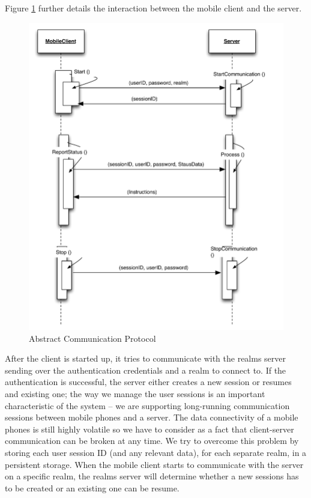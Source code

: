 \noindent Figure \ref{fig.design.comm_protocol} further details the interaction between the mobile client and the server.
\\
\begin{figure}[H]
	\centering
	\includegraphics[width=1.0\linewidth]{fig/abstract_communication_protocol}
	\caption{Abstract Communication Protocol}
	\label{fig.design.comm_protocol}
\end{figure}
\noindent After the client is started up, it tries to communicate with the realms server sending over the authentication credentials and a realm to connect to. If the authentication is successful, the server either creates a new session or resumes and existing one; the way we manage the user sessions is an important characteristic of the system -- we are supporting long-running communication sessions between mobile phones and a server. The data connectivity of a mobile phones is still highly volatile so we have to consider as a fact that client-server communication can be broken at any time. We try to overcome this problem by storing each user session ID (and any relevant data), for each separate realm, in a persistent storage. When the mobile client starts to communicate with the server on a specific realm, the realms server will determine whether a new sessions has to be created or an existing one can be resume.
\\

